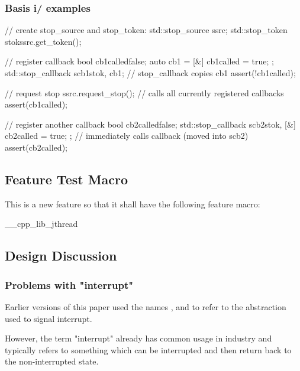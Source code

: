 \subsubsection*{Basis i/ examples}

\begin{codeblock}
// create stop_source and stop_token:
std::stop_source ssrc;
std::stop_token stok{ssrc.get_token()};

// register callback
bool cb1called{false};
auto cb1 = [&]{ cb1called = true; };
std::stop_callback scb1{stok, cb1};  // stop_callback copies cb1
assert(!cb1called);

// request stop
ssrc.request_stop();                 // calls all currently registered callbacks
assert(cb1called);

// register another callback
bool cb2called{false};
std::stop_callback scb2{stok, 
                        [&]{ cb2called = true; }
                       };            // immediately calls callback (moved into scb2)
assert(cb2called);
\end{codeblock}

\subsection*{Feature Test Macro}

This is a new feature so that it shall have the following feature macro:
\begin{codeblock}
	__cpp_lib_jthread
\end{codeblock}



\subsection*{Design Discussion}

\subsubsection*{Problems with "interrupt"}

Earlier versions of this paper used the names ,
 and  to refer to the
abstraction used to signal interrupt.

However, the term "interrupt" already has common usage in industry and
typically refers to something which can be interrupted and then return
back to the non-interrupted state.

